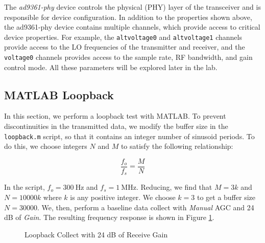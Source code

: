 \documentclass{article}
\begin{document}
The \textit{ad9361-phy} device controls the physical (PHY) layer of the transceiver and is responsible for device configuration. In addition to the properties shown above, the ad9361-phy device contains multiple channels, which provide access to critical device properties. For example, the \texttt{altvoltage0} and \texttt{altvoltage1} channels provide access to the LO frequencies of the transmitter and receiver, and the \texttt{voltage0} channels provides access to the sample rate, RF bandwidth, and gain control mode. All these parameters will be explored later in the lab.


\subsection{MATLAB Loopback}
\label{section::matlab_loopback_results}

In this section, we perform a loopback test with MATLAB. To prevent discontinuities in the transmitted data, we modify the buffer size in the \texttt{loopback.m} script, so that it contains an integer number of sinusoid periods. To do this, we choose integers $N$ and $M$ to satisfy the following relationship:

\begin{equation}
	\frac{f_o}{f_s} = \frac{M}{N}
\end{equation} 

In the script, $f_o = 300\ \text{Hz}$ and $f_s = 1\ \text{MHz}$. Reducing, we find that $M = 3k$ and $N = 10000k$ where $k$ is any positive integer. We choose $k=3$ to get a buffer size $N = 30000$. We, then, perform a baseline data collect with \textit{Manual} AGC and 24 dB of \textit{Gain}. The resulting frequency response is shown in Figure \ref{fig::matlab_loopback_baseline}.

\begin{figure}[H]
	\centerline{}
	\caption{Loopback Collect with 24 dB of Receive Gain}
	\label{fig::matlab_loopback_baseline}
\end{figure}
\end{document}
